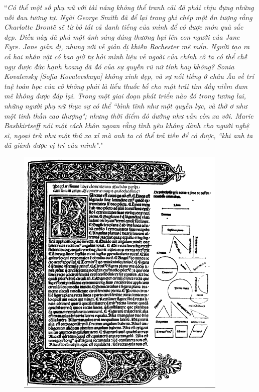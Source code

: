 \begin{multicols}{2}
\begin{figure}[H]
		\vspace*{-5pt}
	\end{figure}
	``\textit{Có thể một số phụ nữ với tài năng không thể tranh cãi đã phải chịu đựng những nỗi đau tương tự. Ngài George Smith đã để lại trong ghi chép một ấn tượng rằng Charlotte Brontë sẽ từ bỏ tất cả danh tiếng của mình để có được món quà sắc đẹp. Điều này đã phủ một ánh sáng đáng thương hại lên con người của Jane Eyre. Jane  giản dị, nhưng với vẻ giản dị khiến Rochester mê mẩn. Người tạo ra cả hai nhân vật có bao giờ tự hỏi mình liệu vẻ ngoài của chính cô ta có thể chế ngự được đức hạnh hoang dã đó của sự quyến rũ nữ tính hay không? Sonia Kovalevsky [Sofia Kovalevskaya] không xinh đẹp, và sự nổi tiếng ở châu Âu về trí tuệ toán học của cô không phải là liểu thuốc bổ cho một trái tim đầy niềm đam mê không được đáp lại. Trong một giai đoạn phát triển nào đó trong tương lai, những người phụ nữ thực sự có thể ``bình tĩnh như một quyền lực, và thờ ơ như một tinh thần cao thượng"; nhưng thời điểm đó dường như vẫn còn xa vời. Marie Bashkirtseff nói một cách khôn ngoan rằng tình yêu không dành cho người nghệ sĩ, ngoại trừ như một thứ xa xỉ mà anh ta có thể trả tiền để có được, ``khi anh ta đã giành được vị trí của mình"}."
	\begin{figure}[H]
		\vspace*{-5pt}
		\centering
		\captionsetup{labelformat= empty, justification=centering}
		\includegraphics[width= 0.75\linewidth]{2}

\end{figure}
\end{multicols}
